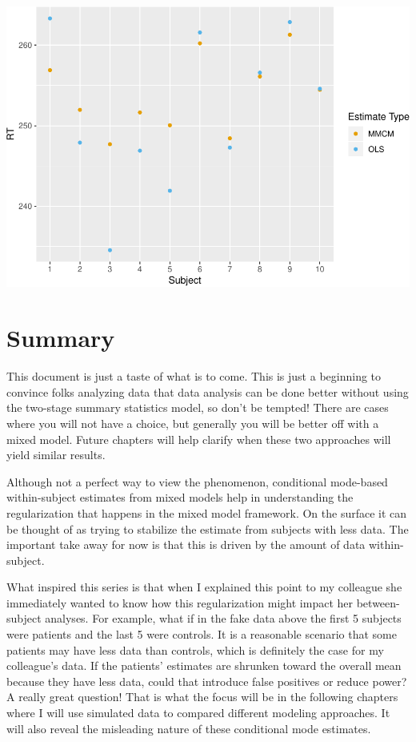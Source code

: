 \documentclass[
]{book}
\begin{document}
\includegraphics{2_video4_two_stage_temptation_files/figure-latex/unnamed-chunk-6-1.pdf}

\hypertarget{summary-1}{%
\section{Summary}\label{summary-1}}

This document is just a taste of what is to come. This is just a beginning to convince folks analyzing data that data analysis can be done better without using the two-stage summary statistics model, so don't be tempted! There are cases where you will not have a choice, but generally you will be better off with a mixed model. Future chapters will help clarify when these two approaches will yield similar results.

Although not a perfect way to view the phenomenon, conditional mode-based within-subject estimates from mixed models help in understanding the regularization that happens in the mixed model framework. On the surface it can be thought of as trying to stabilize the estimate from subjects with less data. The important take away for now is that this is driven by the amount of data within-subject.

What inspired this series is that when I explained this point to my colleague she immediately wanted to know how this regularization might impact her between-subject analyses. For example, what if in the fake data above the first 5 subjects were patients and the last 5 were controls. It is a reasonable scenario that some patients may have less data than controls, which is definitely the case for my colleague's data. If the patients' estimates are shrunken toward the overall mean because they have less data, could that introduce false positives or reduce power? A really great question! That is what the focus will be in the following chapters where I will use simulated data to compared different modeling approaches. It will also reveal the misleading nature of these conditional mode estimates.
\end{document}
